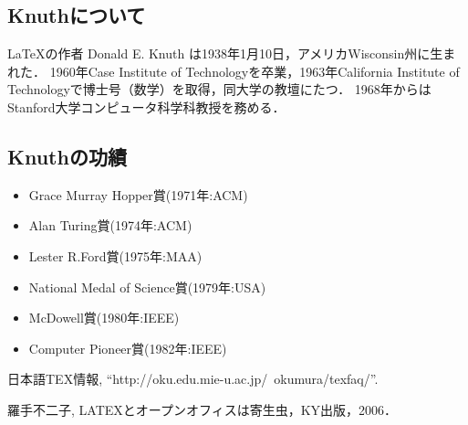 \documentclass[a4j]{jarticle}
\begin{document}
\subsection{Knuthについて}

\LaTeX の作者 Donald E. Knuth は1938年1月10日，アメリカWisconsin州に生まれた．
1960年Case Institute of Technologyを卒業，1963年California Institute of Technologyで博士号（数学）を取得，同大学の教壇にたつ．
1968年からはStanford大学コンピュータ科学科教授を務める\cite{W3TEX}．

\subsection{Knuthの功績}

\begin{itemize}
\item Grace Murray Hopper賞(1971年:ACM)

\item Alan Turing賞(1974年:ACM)

\item Lester R.Ford賞(1975年:MAA)

\item National Medal of Science賞(1979年:USA)

\item McDowell賞(1980年:IEEE)

\item Computer Pioneer賞(1982年:IEEE)
\end{itemize}


\begin{thebibliography}{99}

  
  日本語TEX情報, ``http://oku.edu.mie-u.ac.jp/~okumura/texfaq/''.

  羅手不二子, LATEXとオープンオフィスは寄生虫，KY出版，2006．
  
\end{thebibliography}



\end{document}
